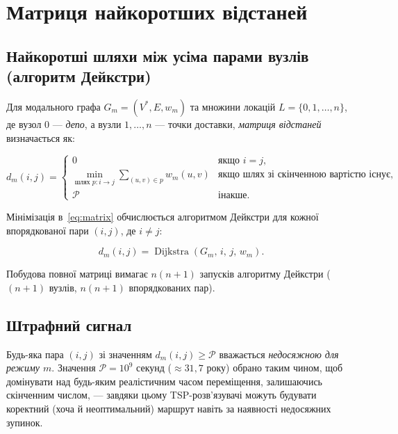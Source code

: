 \documentclass[12pt, a4paper]{article}
\theoremstyle{definition}
\begin{document}
\section{Матриця найкоротших відстаней}

\subsection{Найкоротші шляхи між усіма парами вузлів (алгоритм Дейкстри)}

Для модального графа $G_m = (V^*, E, w_m)$ та множини локацій
$L = \{0, 1, \ldots, n\}$, де вузол $0$ --- \emph{депо}, а вузли
$1, \ldots, n$ --- точки доставки, \emph{матриця відстаней} визначається як:

\begin{equation}
  \label{eq:matrix}
  d_m(i, j) =
  \begin{cases}
    0 & \text{якщо } i = j, \\
    \displaystyle\min_{\text{шлях } p: i \to j}
      \sum_{(u,v) \in p} w_m(u,v)
      & \text{якщо шлях зі скінченною вартістю існує,} \\
    \mathcal{P} & \text{інакше.}
  \end{cases}
\end{equation}

Мінімізація в~\eqref{eq:matrix} обчислюється алгоритмом Дейкстри для кожної
впорядкованої пари $(i, j)$, де $i \neq j$:

\[
  d_m(i, j) = \operatorname{Dijkstra}(G_m,\, i,\, j,\, w_m).
\]

Побудова повної матриці вимагає $n(n+1)$ запусків алгоритму Дейкстри
($(n+1)$ вузлів, $n(n+1)$ впорядкованих пар).

\subsection{Штрафний сигнал}

Будь-яка пара $(i, j)$ зі значенням $d_m(i, j) \geq \mathcal{P}$
вважається \emph{недосяжною для режиму $m$}. Значення $\mathcal{P} = 10^9$
секунд ($\approx 31{,}7$ року) обрано таким чином, щоб домінувати над будь-яким
реалістичним часом переміщення, залишаючись скінченним числом, --- завдяки
цьому TSP-розв'язувачі можуть будувати коректний (хоча й неоптимальний)
маршрут навіть за наявності недосяжних зупинок.
\end{document}
